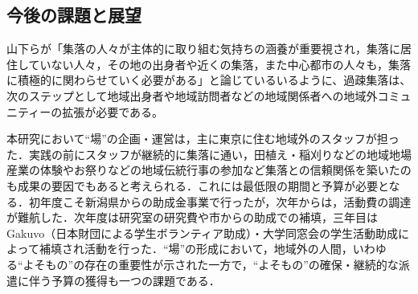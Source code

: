 \documentclass[a4paper]{jsarticle}
\begin{document}
\subsection{今後の課題と展望}
山下らが「集落の人々が主体的に取り組む気持ちの涵養が重要視され，集落に居住していない人々，その地の出身者や近くの集落，また中心都市の人々も，集落に積極的に関わらせていく必要がある」\cite{7}と論じているいるように、過疎集落は、次のステップとして地域出身者や地域訪問者などの地域関係者への地域外コミュニティーの拡張が必要である。

本研究において“場”の企画・運営は，主に東京に住む地域外のスタッフが担った．実践の前にスタッフが継続的に集落に通い，田植え・稲刈りなどの地域地場産業の体験やお祭りなどの地域伝統行事の参加など集落との信頼関係を築いたのも成果の要因でもあると考えられる．これには最低限の期間と予算が必要となる．初年度こそ新潟県からの助成金事業で行ったが，次年からは，活動費の調達が難航した．次年度は研究室の研究費や市からの助成での補填，三年目はGakuvo（日本財団による学生ボランティア助成）・大学同窓会の学生活動助成によって補填され活動を行った．“場”の形成において，地域外の人間，いわゆる“よそもの”の存在の重要性が示された一方で，“よそもの”の確保・継続的な派遣に伴う予算の獲得も一つの課題である．\par


\newpage
\end{document}
